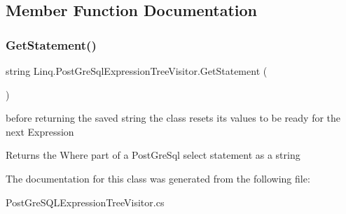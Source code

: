 \subsection{Member Function Documentation}
\mbox{\label{class_linq_1_1_post_gre_sql_expression_tree_visitor_a0f8b065e5a69ee6f610cee03f7a3fc6d}} 
\subsubsection{\texorpdfstring{Get\+Statement()}{GetStatement()}}
{\footnotesize\ttfamily string Linq.\+Post\+Gre\+Sql\+Expression\+Tree\+Visitor.\+Get\+Statement (\begin{DoxyParamCaption}{ }\end{DoxyParamCaption})\hspace{0.3cm}{\ttfamily [inline]}}



before returning the saved string the class resets its values to be ready for the next Expression 

\begin{DoxyReturn}{Returns}
the Where part of a Post\+Gre\+Sql select statement as a string
\end{DoxyReturn}


The documentation for this class was generated from the following file\+:\begin{DoxyCompactItemize}
\item 
Post\+Gre\+S\+Q\+L\+Expression\+Tree\+Visitor.\+cs\end{DoxyCompactItemize}
